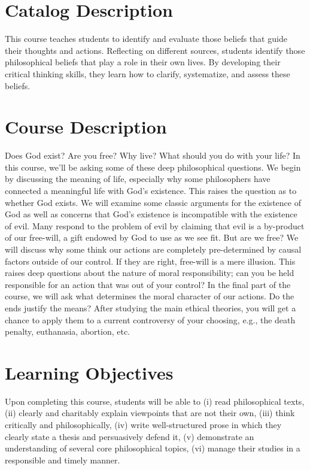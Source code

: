 \documentclass[article,oneside]{memoir}
\begin{document}
\section{Catalog Description}

This course teaches students to identify and evaluate those beliefs that guide their thoughts and actions. Reflecting on different sources, students identify those philosophical beliefs that play a role in their own lives. By developing their critical thinking skills, they learn how to clarify, systematize, and assess these beliefs. 

\section{Course Description}

Does God exist? Are you free? Why live? What should you do with your life?  In this course, we'll be asking some of these deep philosophical questions. We begin by discussing the meaning of life, especially why some philosophers have connected a meaningful life with God's existence. This raises the question as to whether God exists. We will examine some classic arguments for the existence of God as well as concerns that God's existence is incompatible with the existence of evil. Many respond to the problem of evil by claiming that evil is a by-product of our free-will, a gift endowed by God to use as we see fit. But are we free? We will discuss why some think our actions are completely pre-determined by causal factors outside of our control. If they are right, free-will is a mere illusion. This raises deep questions about the nature of moral responsibility; can you be held responsible for an action that was out of your control? In the final part of the course, we will ask what determines the moral character of our actions. Do the ends justify the means? After studying the main ethical theories, you will get a chance to apply them to a current controversy of your choosing, e.g., the death penalty, euthanasia, abortion, etc. 

\section{Learning Objectives}

Upon completing this course, students will be able to (i) read
philosophical texts, (ii) clearly and charitably explain viewpoints that
are not their own, (iii) think critically and philosophically, (iv)
write well-structured prose in which they clearly state a thesis and
persuasively defend it, (v) demonstrate an understanding of several core
philosophical topics, (vi) manage their studies in a responsible and timely manner. 
\end{document}
